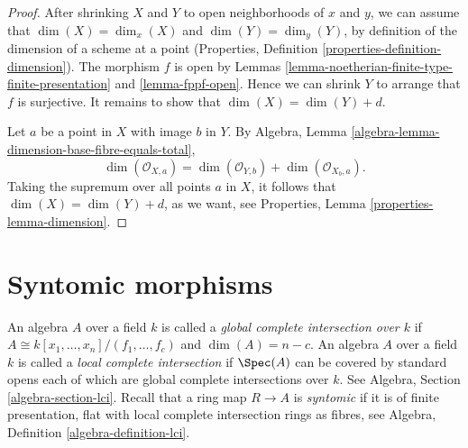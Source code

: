 \begin{proof}
After shrinking $X$ and $Y$ to open neighborhoods of $x$ and $y$,
we can assume that $\dim(X) = \dim_x(X)$ and $\dim(Y) = \dim_y(Y)$,
by definition of the dimension of a scheme at a point
(Properties, Definition \ref{properties-definition-dimension}).
The morphism $f$ is open by Lemmas
\ref{lemma-noetherian-finite-type-finite-presentation} and
\ref{lemma-fppf-open}.
Hence we can shrink $Y$ to arrange that $f$ is surjective.
It remains to show that $\dim(X) = \dim(Y) + d$.

\medskip\noindent
Let $a$ be a point in $X$ with image $b$ in $Y$. By
Algebra, Lemma \ref{algebra-lemma-dimension-base-fibre-equals-total},
$$
\dim(\mathcal{O}_{X,a}) = \dim(\mathcal{O}_{Y,b}) + \dim(\mathcal{O}_{X_b, a}).
$$
Taking the supremum over all points $a$ in $X$, it follows
that $\dim(X) = \dim(Y) + d$, as we want, see
Properties, Lemma \ref{properties-lemma-dimension}.
\end{proof}











\section{Syntomic morphisms}
\label{section-syntomic}

\noindent
An algebra $A$ over a field $k$ is called a
{\it global complete intersection over $k$}
if $A \cong k[x_1, \ldots, x_n]/(f_1, \ldots, f_c)$ and
$\dim(A) = n - c$. An algebra $A$ over a field $k$ is called a
{\it local complete intersection} if $\Spec(A)$
can be covered by standard opens each of which are global
complete intersections over $k$. See Algebra, Section
\ref{algebra-section-lci}. Recall that a ring map $R \to A$
is {\it syntomic} if it is of finite presentation,
flat with local complete intersection rings as fibres,
see Algebra, Definition \ref{algebra-definition-lci}.

